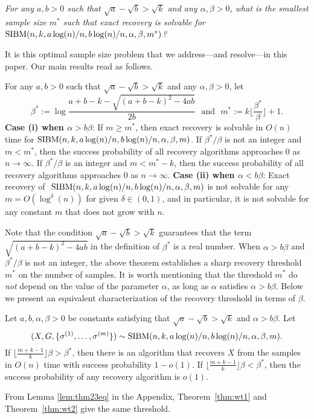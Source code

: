 \documentclass{article}
\begin{document}
\vspace*{.1in}
 \emph{For any $a,b> 0$ such that $\sqrt{a}-\sqrt{b}> \sqrt{k}$ and any $\alpha,\beta>0$, what is the smallest sample size $m^\ast$ such that exact recovery is solvable for $\operatorname{SIBM}(n,k, a\log(n)/n, b\log(n)/n,\alpha,\beta,m^\ast)$?}

\vspace*{.1in}  It is this optimal sample size problem that we address---and resolve---in this paper. 
Our main results read as follows.

\begin{theorem} \label{thm:wt1}
For any $a,b> 0$ such that $\sqrt{a}-\sqrt{b}> \sqrt{k}$ and any $\alpha,\beta>0$, let
\begin{equation} \label{eq:defstar}
\beta^\ast := 
\log\frac{a+b-k-\sqrt{(a+b-k)^2-4ab}}{2 b} \text{~~and~~}
m^\ast := k \Big\lfloor \frac{\beta^\ast}{\beta} \Big\rfloor +1  .
\end{equation}
{\bf Case (i) when $\alpha>b\beta$}: If $m\ge m^\ast$, then exact recovery is solvable in $O(n)$ time for $\SIBM(n,k, a\log(n)/n, \linebreak[4] b\log(n)/n,\alpha,\beta,m)$.
If $\beta^\ast/\beta$ is not an integer and $m < m^*$, then the success probability of all recovery algorithms approaches $0$ as $n\to\infty$. If $\beta^\ast/\beta$ is an integer and $m < m^* - k$, then the success probability of all recovery algorithms approaches $0$ as $n\to\infty$.
{\bf Case (ii) when $\alpha<b\beta$}: Exact recovery of $~\operatorname{SIBM}(n,k, a\log(n)/n, b\log(n)/n,\alpha,\beta,m)$ is not solvable for any $m=O(\log^{\delta}(n))$ for given $\delta \in (0, 1)$, and in particular, it is not solvable for any constant $m$ that does not grow with $n$.
\end{theorem}
Note that the condition $\sqrt{a}-\sqrt{b} > \sqrt{k}$ guarantees that the term $\sqrt{(a+b-k)^2-4ab}$ in the definition of $\beta^\ast$ is a  real number.
When $\alpha>b\beta$ and $\beta^\ast/\beta$ is not an integer,
the above theorem establishes a sharp recovery threshold $m^\ast$ on the number of samples. It is worth mentioning that the threshold $m^\ast$ do {\em not} depend on the value of the parameter $\alpha$, as long as $\alpha$ satisfies $\alpha>b\beta$.
Below we present an equivalent characterization of the recovery threshold in terms of $\beta$.
\begin{theorem} \label{thm:wt2}
	Let $a,b,\alpha,\beta> 0$ be constants satisfying that $\sqrt{a}-\sqrt{b} > \sqrt{k}$ and $\alpha>b\beta$. 
	Let 
	$$
	(X,G,\{\sigma^{(1)},\dots,\sigma^{(m)}\}) \sim \operatorname{SIBM}(n, k, a\log(n)/n, b\log(n)/n,\alpha,\beta,m).
	$$
	If $\lfloor \frac{m+k-1}{k} \rfloor \beta>\beta^\ast$, then there is an algorithm that recovers $X$ from the samples in $O(n)$ time with success probability $1-o(1)$. If $\lfloor \frac{m+k-1}{k} \rfloor \beta <\beta^\ast$, then the success probability of any recovery algorithm is $o(1)$. 
\end{theorem}
From Lemma \ref{lem:thm23eq} in the Appendix, Theorem~\ref{thm:wt1} and Theorem~\ref{thm:wt2} give the same threshold.
\end{document}
